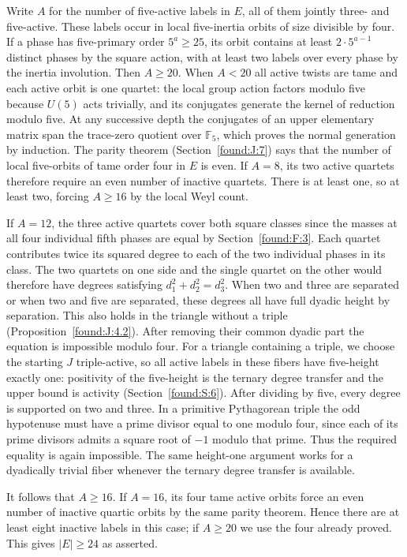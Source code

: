 \documentclass[11pt,a4paper]{article}
\numberwithin{equation}{section}
\theoremstyle{remark}
\begin{document}
Write $A$ for the number of five-active labels in $E$, all of them jointly three- and five-active. These labels occur in local five-inertia orbits of size divisible by four. If a phase has five-primary order $5^a\ge25$, its orbit contains at least $2\cdot 5^{a-1}$ distinct phases by the square action, with at least two labels over every phase by the inertia involution. Then $A\ge20$. When $A<20$ all active twists are tame and each active orbit is one quartet: the local group action factors modulo five because $U(5)$ acts trivially, and its conjugates generate the kernel of reduction modulo five. At any successive depth the conjugates of an upper elementary matrix span the trace-zero quotient over $\mathbb F_5$, which proves the normal generation by induction. The parity theorem (Section~\ref{found:J:7}) says that the number of local five-orbits of tame order four in $E$ is even. If $A=8$, its two active quartets therefore require an even number of inactive quartets. There is at least one, so at least two, forcing $A\ge16$ by the local Weyl count.

If $A=12$, the three active quartets cover both square classes since the masses at all four individual fifth phases are equal by Section~\ref{found:F:3}. Each quartet contributes twice its squared degree to each of the two individual phases in its class. The two quartets on one side and the single quartet on the other would therefore have degrees satisfying $d_1^2+d_2^2=d_3^2$. When two and three are separated or when two and five are separated, these degrees all have full dyadic height by separation. This also holds in the triangle without a triple (Proposition~\ref{found:J:4.2}). After removing their common dyadic part the equation is impossible modulo four. For a triangle containing a triple, we choose the starting $J$ triple-active, so all active labels in these fibers have five-height exactly one: positivity of the five-height is the ternary degree transfer and the upper bound is activity (Section~\ref{found:S:6}). After dividing by five, every degree is supported on two and three. In a primitive Pythagorean triple the odd hypotenuse must have a prime divisor equal to one modulo four, since each of its prime divisors admits a square root of $-1$ modulo that prime. Thus the required equality is again impossible. The same height-one argument works for a dyadically trivial fiber whenever the ternary degree transfer is available.

It follows that $A\ge16$. If $A=16$, its four tame active orbits force an even number of inactive quartic orbits by the same parity theorem. Hence there are at least eight inactive labels in this case; if $A\ge20$ we use the four already proved. This gives $|E|\ge24$ as asserted.
\end{document}
